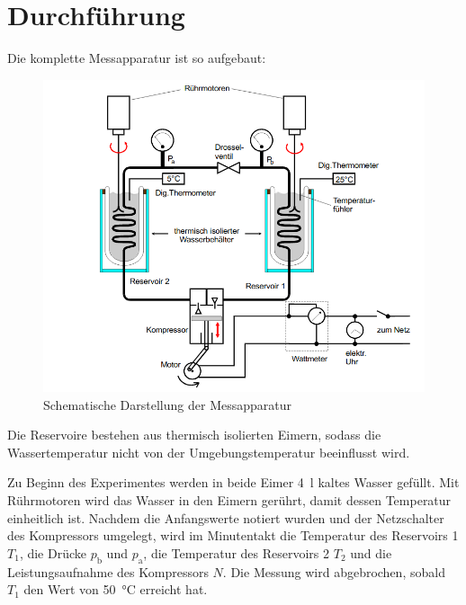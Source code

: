 \section{Durchführung}
\label{sec:Durchführung}
Die komplette Messapparatur ist so aufgebaut:
\begin{figure}
\centering
\includegraphics{Darstellung_Waermepumpe.png}
\caption{Schematische Darstellung der Messapparatur \cite[4]{anleitung}}
\end{figure}
Die Reservoire bestehen aus thermisch isolierten Eimern, sodass die Wassertemperatur nicht von der Umgebungstemperatur beeinflusst wird.

Zu Beginn des Experimentes werden in beide Eimer \SI{4}{\litre} kaltes Wasser gefüllt. 
Mit Rührmotoren wird das Wasser in den Eimern gerührt, damit dessen Temperatur einheitlich ist.
Nachdem die Anfangswerte notiert wurden und der Netzschalter des Kompressors umgelegt, wird im Minutentakt die Temperatur des Reservoirs 1 $T_{1}$, die Drücke $p_{\text{b}}$ und $p_{\text{a}}$, die Temperatur des Reservoirs 2 $T_{2}$ und die Leistungsaufnahme des Kompressors $N$.
Die Messung wird abgebrochen, sobald $T_1$ den Wert von \SI{50}{\celsius} erreicht hat.

